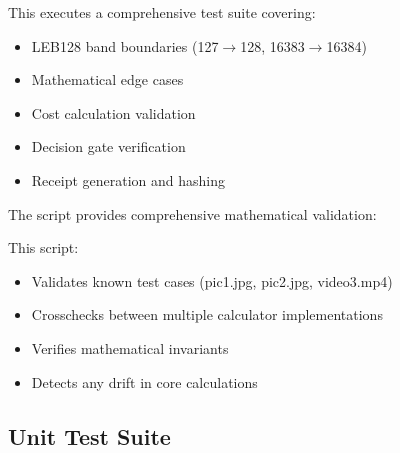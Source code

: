 \documentclass[letterpaper,10pt,english]{sphinxmanual}
\begin{document}
\sphinxAtStartPar
This executes a comprehensive test suite covering:
\begin{itemize}
\item {} 
\sphinxAtStartPar
LEB128 band boundaries (127\(\rightarrow\)128, 16383\(\rightarrow\)16384)

\item {} 
\sphinxAtStartPar
Mathematical edge cases

\item {} 
\sphinxAtStartPar
Cost calculation validation

\item {} 
\sphinxAtStartPar
Decision gate verification

\item {} 
\sphinxAtStartPar
Receipt generation and hashing

\end{itemize}

\sphinxAtStartPar
{}

\sphinxAtStartPar
The  script provides comprehensive mathematical validation:

\begin{sphinxVerbatim}[commandchars=\\\{\}]
\end{sphinxVerbatim}

\sphinxAtStartPar
This script:
\begin{itemize}
\item {} 
\sphinxAtStartPar
Validates known test cases (pic1.jpg, pic2.jpg, video3.mp4)

\item {} 
\sphinxAtStartPar
Cross\sphinxhyphen{}checks between multiple calculator implementations

\item {} 
\sphinxAtStartPar
Verifies mathematical invariants

\item {} 
\sphinxAtStartPar
Detects any drift in core calculations

\end{itemize}


\subsection{Unit Test Suite}
\label{\detokenize{testing:unit-test-suite}}
\sphinxAtStartPar
{}
\end{document}
